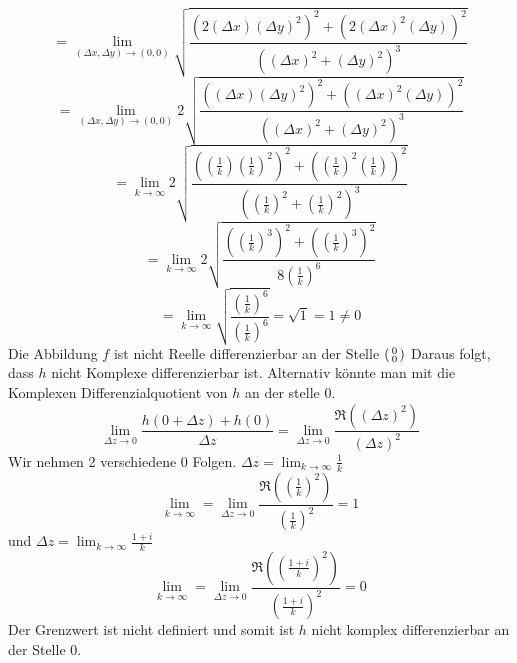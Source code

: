 \documentclass{scrartcl}
\begin{document}
\[=\lim_{(\Delta x,\Delta y)\rightarrow(0,0)}\sqrt{\frac{\left(2 (\Delta x) (\Delta y)^2\right)^2+\left(2 (\Delta x)^2 (\Delta y)\right)^2}{\left((\Delta x)^2+(\Delta y)^2\right)^3}}\]
\[=\lim_{(\Delta x,\Delta y)\rightarrow(0,0)}2 \sqrt{\frac{\left((\Delta x) (\Delta y)^2\right)^2+\left((\Delta x)^2 (\Delta y)\right)^2}{\left((\Delta x)^2+(\Delta y)^2\right)^3}}\]
\[=\lim_{k\rightarrow \infty }2 \sqrt{\frac{\left((\frac{1}{k}) (\frac{1}{k})^2\right)^2+\left((\frac{1}{k})^2 (\frac{1}{k})\right)^2}{\left((\frac{1}{k})^2+(\frac{1}{k})^2\right)^3}}\]
\[=\lim_{k\rightarrow \infty }2 \sqrt{\frac{\left((\frac{1}{k})^3\right)^2+\left((\frac{1}{k})^3 \right)^2}{8(\frac{1}{k})^6}}\]
\[=\lim_{k\rightarrow \infty } \sqrt{\frac{(\frac{1}{k})^6}{(\frac{1}{k})^6}}=\sqrt{1}=1\neq0\]
Die Abbildung $f$ ist nicht Reelle differenzierbar an der Stelle \(\begin{psmallmatrix}0\\0\end{psmallmatrix}\)
Daraus folgt, dass $h$ nicht Komplexe differenzierbar ist.
Alternativ könnte man mit die Komplexen Differenzialquotient von $h$ an der stelle 0.
\[\lim_{\Delta z\rightarrow 0}\frac{h(0+\Delta z)+h(0)}{\Delta z}=\lim_{\Delta z\rightarrow 0}\frac{\Re((\Delta z)^2)}{(\Delta z)^2}\]
Wir nehmen 2 verschiedene 0 Folgen.
\(\Delta z=\lim_{k\rightarrow\infty}\frac{1}k\)
\[\lim_{k\rightarrow\infty}=\lim_{\Delta z\rightarrow 0}\frac{\Re((\frac 1 k)^2)}{(\frac 1 k)^2}=1\]
und \(\Delta z=\lim_{k\rightarrow\infty}\frac{1+i}k\)
\[\lim_{k\rightarrow\infty}=\lim_{\Delta z\rightarrow 0}\frac{\Re((\frac {1+i} k)^2)}{(\frac {1+i} k)^2}=0\]
Der Grenzwert ist nicht definiert und somit ist $h$ nicht komplex differenzierbar an der Stelle 0.
\end{document}
